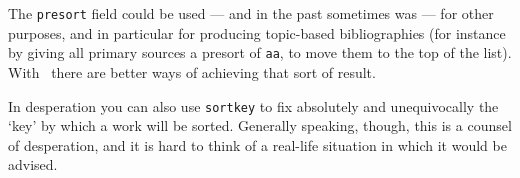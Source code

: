 The \texttt{presort} field could be used --- and in the past sometimes
was --- for other purposes, and in particular for producing
topic-based bibliographies (for instance by giving all primary sources
a presort of \texttt{aa}, to move them to the top of the list). With
\biblatex\ there are better ways of achieving that sort of
result.

In desperation you can also use \texttt{sortkey} to fix absolutely and
unequivocally the `key' by which a work will be sorted. Generally
speaking, though, this is a counsel of desperation, and it is hard to
think of a real-life situation in which it would be advised.

